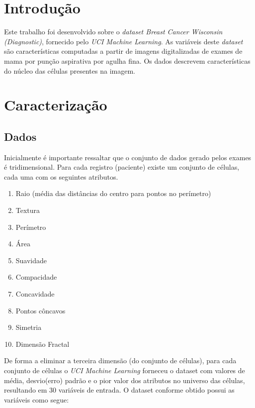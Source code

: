 \documentclass[11pt,a4paper]{article}
\numberwithin{equation}{section}
\begin{document}

\section{Introdução}
Este trabalho foi desenvolvido sobre o \textit{dataset Breast Cancer Wisconsin (Diagnostic)}, fornecido pelo  \textit{UCI Machine Learning}. As variáveis deste \textit{dataset} são características computadas a partir de imagens digitalizadas de exames de mama por punção aspirativa por agulha fina. Os dados descrevem características do núcleo das células presentes na imagem. 
\section{Caracterização}

\subsection{Dados}


Inicialmente é importante ressaltar que o conjunto de dados gerado pelos exames é tridimensional. Para cada registro (paciente) existe um conjunto de células, cada uma com os seguintes atributos.

\begin{enumerate}
\item Raio (média das distâncias do centro para pontos no perímetro)
\item Textura
\item Perímetro
\item Área
\item Suavidade
\item Compacidade
\item Concavidade
\item Pontos côncavos
\item Simetria
\item Dimensão Fractal
\end{enumerate}

De forma a eliminar a terceira dimensão (do conjunto de células), para cada conjunto de células o \textit{UCI Machine Learning} forneceu o dataset com valores de média, desvio(erro) padrão e o pior valor dos atributos no universo das células, resultando em 30 variáveis de entrada. O dataset conforme obtido possui as variáveis como segue:
\end{document}
